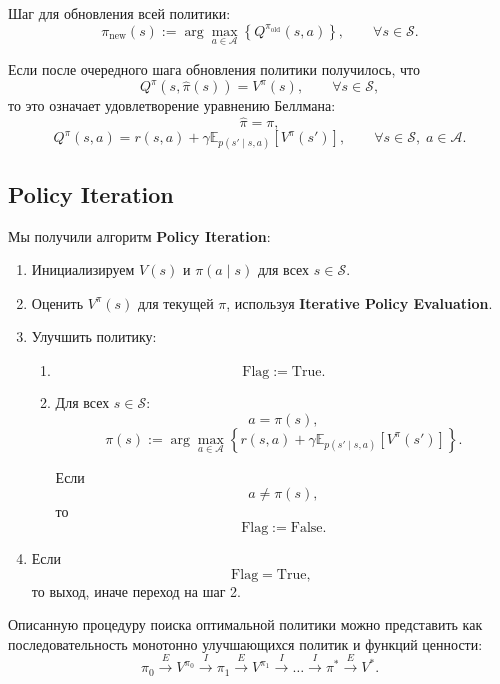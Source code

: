 \documentclass[12pt,a4paper]{article}
\begin{document}
Шаг для обновления всей политики:
\[
\pi_{\mathrm{new}}(s)
:=
\arg\max_{a \in \mathcal A}
\left\{
Q^{\pi_{\mathrm{old}}}(s,a)
\right\},
\qquad
\forall s \in \mathcal S.
\]

Если после очередного шага обновления политики получилось, что
\[
Q^\pi(s,\hat \pi(s)) = V^\pi(s),
\qquad
\forall s \in \mathcal S,
\]
то это означает удовлетворение уравнению Беллмана:
\[
\hat \pi = \pi,
\]
\[
Q^\pi(s,a)
=
r(s,a)
+
\gamma
\mathbb E_{p(s'\mid s,a)}
\left[
V^\pi(s')
\right],
\qquad
\forall s \in \mathcal S,\; a \in \mathcal A.
\]

\subsection{Policy Iteration}

Мы получили алгоритм \textbf{Policy Iteration}:

\begin{enumerate}
    \item Инициализируем $V(s)$ и $\pi(a \mid s)$ для всех $s \in \mathcal S$.

    \item Оценить $V^\pi(s)$ для текущей $\pi$, используя \textbf{Iterative Policy Evaluation}.

    \item Улучшить политику:
    \begin{enumerate}
        \item
        \[
        \mathrm{Flag} := \mathrm{True}.
        \]

        \item Для всех $s \in \mathcal S$:
        \[
        a = \pi(s),
        \]
        \[
        \pi(s)
        :=
        \arg\max_{a \in \mathcal A}
        \left\{
        r(s,a)
        +
        \gamma
        \mathbb E_{p(s'\mid s,a)}
        \left[
        V^\pi(s')
        \right]
        \right\}.
        \]

        Если
        \[
        a \ne \pi(s),
        \]
        то
        \[
        \mathrm{Flag} := \mathrm{False}.
        \]
    \end{enumerate}

    \item Если
    \[
    \mathrm{Flag} = \mathrm{True},
    \]
    то выход, иначе переход на шаг 2.
\end{enumerate}

Описанную процедуру поиска оптимальной политики можно представить как последовательность монотонно улучшающихся политик и функций ценности:
\[
\pi_0
\xrightarrow{E}
V^{\pi_0}
\xrightarrow{I}
\pi_1
\xrightarrow{E}
V^{\pi_1}
\xrightarrow{I}
\ldots
\xrightarrow{I}
\pi^\ast
\xrightarrow{E}
V^\ast.
\]
\end{document}
